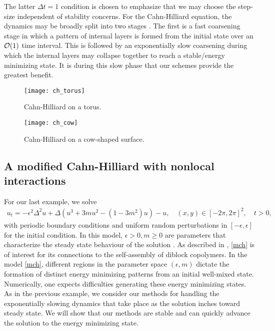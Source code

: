 The latter $\Delta t =1$ condition is chosen to emphasize that we may choose the step-size independent of stability concerns. For the Cahn-Hilliard equation, the dynamics may be broadly split into two stages \cite{sun2000dynamics}. The first is a fast coarsening stage in which a pattern of internal layers is formed from the initial state over an $\mathcal{O}(1)$ time interval. This is followed by an exponentially slow coarsening during which the internal layers may collapse together to reach a stable/energy minimizing state. It is during this slow phase that our schemes provide the greatest benefit. 

\begin{figure}[htb!]
	\centering
\texttt{[image: ch\_torus]}
\caption[Cahn-Hilliard on a torus]{Cahn-Hilliard on a torus.}
\label{fig:ch torus}
\end{figure}
\begin{figure}[htb!]
	\centering
\texttt{[image: ch\_cow]}
\caption[Cahn-Hilliard on a cow-shaped surface]{Cahn-Hilliard on a cow-shaped surface.}
\label{fig:ch cow}
\end{figure}

\subsection{A modified Cahn-Hilliard with nonlocal interactions}
For our last example, we solve 
\begin{align}
        u_t = -\epsilon^2 \Delta^2 u + \Delta (u^3 + 3mu^2 - (1-3m^2)u) - u, 
\quad (x,y)\in[-2\pi,2\pi]^2,
\quad t>0,
\label{mch}
\end{align}
with periodic boundary conditions and uniform random perturbations in $[-\epsilon,\epsilon]$ for the initial condition. In this model, $\epsilon>0, m\geq 0$ are parameters that characterize the steady state behaviour of the solution \cite{choksi2009phase,choksi20112d}. As described in \cite{choksi2009phase}, \cref{mch} is of interest for its connections to the self-assembly of diblock copolymers. In the model \cref{mch}, different regions in the parameter space $(\epsilon, m)$ dictate the formation of distinct energy minimizing patterns from an initial well-mixed state. Numerically, one expects difficulties generating these energy minimizing states. As in the previous example, we consider our methods for handling the exponentially slowing dynamics that take place as the solution inches toward steady state. We will show that our methods are stable and can quickly advance the solution to the energy minimizing state. 

